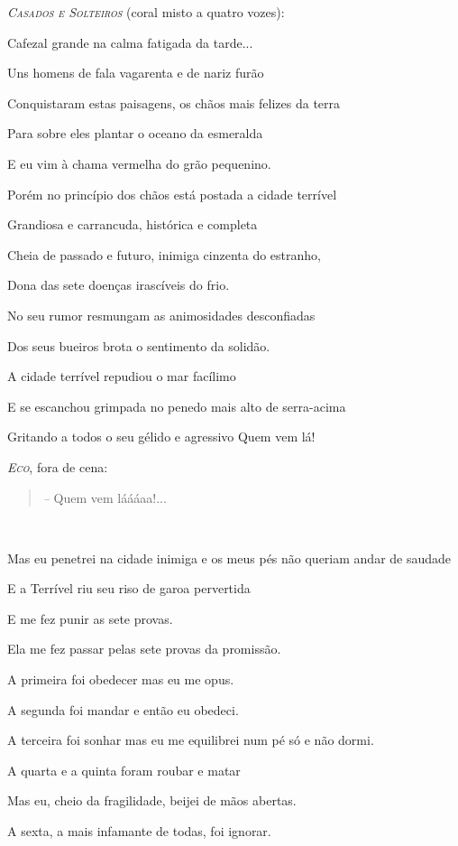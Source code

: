 \emph{\textsc{Casados e Solteiros}} (coral misto a quatro vozes):

Cafezal grande na calma fatigada da tarde...

Uns homens de fala vagarenta e de nariz furão

Conquistaram estas paisagens, os chãos mais felizes da terra

Para sobre eles plantar o oceano da esmeralda

E eu vim à chama vermelha do grão pequenino.

Porém no princípio dos chãos está postada a cidade terrível

Grandiosa e carrancuda, histórica e completa

Cheia de passado e futuro, inimiga cinzenta do estranho,

Dona das sete doenças irascíveis do frio.

No seu rumor resmungam as animosidades desconfiadas

Dos seus bueiros brota o sentimento da solidão.

A cidade terrível repudiou o mar facílimo

E se escanchou grimpada no penedo mais alto de serra-acima

Gritando a todos o seu gélido e agressivo Quem vem lá!

\emph{\textsc{Eco}}, fora de cena:

\begin{quote}
\emph{--} Quem vem láááaa!...
\end{quote}

\emph{\\
}

Mas eu penetrei na cidade inimiga e os meus pés não queriam andar de
saudade

E a Terrível riu seu riso de garoa pervertida

E me fez punir as sete provas.

Ela me fez passar pelas sete provas da promissão.

A primeira foi obedecer mas eu me opus.

A segunda foi mandar e então eu obedeci.

A terceira foi sonhar mas eu me equilibrei num pé só e não dormi.

A quarta e a quinta foram roubar e matar

Mas eu, cheio da fragilidade, beijei de mãos abertas.

A sexta, a mais infamante de todas, foi ignorar.

